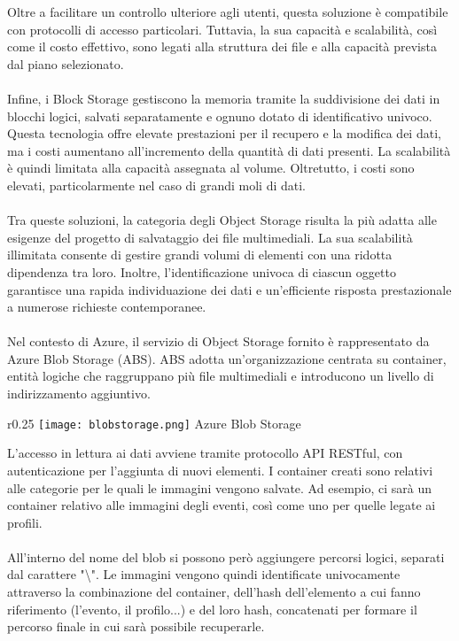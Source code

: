 Oltre a facilitare un controllo ulteriore agli utenti, 
questa soluzione è compatibile con protocolli di accesso particolari. 
Tuttavia, la sua capacità e scalabilità, così come il costo effettivo, 
sono legati alla struttura dei file e alla capacità prevista dal piano selezionato.\\
\\
Infine,
i Block Storage gestiscono la memoria tramite la suddivisione dei dati in blocchi logici,
salvati separatamente e ognuno dotato di identificativo univoco. 
Questa tecnologia offre elevate prestazioni per il recupero e la modifica dei dati, 
ma i costi aumentano all'incremento della quantità di dati presenti. 
La scalabilità è quindi limitata alla capacità assegnata al volume. 
Oltretutto, i costi sono elevati, particolarmente nel caso di grandi moli di dati.\\
\\
Tra queste soluzioni, 
la categoria degli Object Storage risulta la più adatta alle esigenze del progetto
di salvataggio dei file multimediali. 
La sua scalabilità illimitata consente di gestire grandi volumi di elementi 
con una ridotta dipendenza tra loro. 
Inoltre,
l'identificazione univoca di ciascun oggetto garantisce una rapida individuazione dei dati e 
un'efficiente risposta prestazionale a numerose richieste contemporanee.\\
\\
Nel contesto di Azure, 
il servizio di Object Storage fornito è rappresentato da Azure Blob Storage (ABS). 
ABS adotta un'organizzazione centrata su container, 
entità logiche che raggruppano più file multimediali e introducono un livello di indirizzamento aggiuntivo. 
\begin{wrapfigure}{r}{0.25\textwidth}
    \centering
    \texttt{[image: blobstorage.png]}
    Azure Blob Storage
\end{wrapfigure}
L'accesso in lettura ai dati avviene tramite protocollo API RESTful, 
con autenticazione per l'aggiunta di nuovi elementi. 
I container creati sono relativi alle categorie per le quali le immagini vengono salvate.
Ad esempio, ci sarà un container relativo alle immagini degli eventi,
così come uno per quelle legate ai profili.\\
\\
All'interno del nome del blob si possono però aggiungere percorsi logici, 
separati dal carattere "\textbackslash".
Le immagini vengono quindi identificate univocamente attraverso la combinazione 
del container, dell'hash dell'elemento a cui fanno riferimento (l'evento, il profilo...) 
e del loro hash, concatenati per formare il percorso finale in cui sarà possibile recuperarle.

